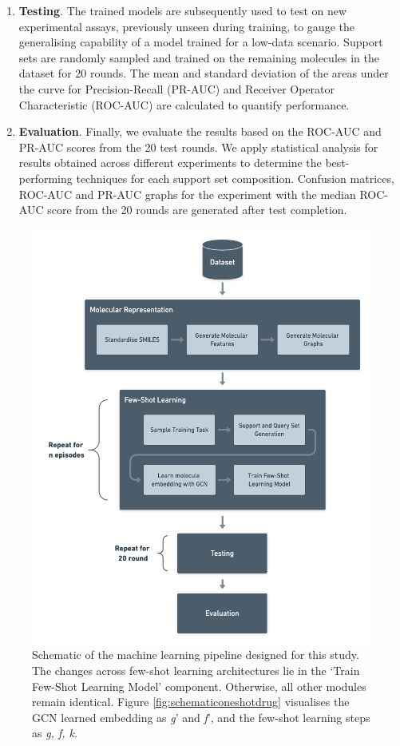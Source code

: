 \documentclass[journal=jcisd8,manuscript=article]{achemso} %
\begin{document}
\begin{enumerate}
    \item \textbf{Testing}. The trained models are subsequently used to test on new experimental assays, previously unseen during training, to gauge the generalising capability of a model trained for a low-data scenario. Support sets are randomly sampled and trained on the remaining molecules in the dataset for 20 rounds. The mean and standard deviation of the areas under the curve for Precision-Recall (PR-AUC) and Receiver Operator Characteristic (ROC-AUC) are calculated to quantify performance.

    \item \textbf{Evaluation}. Finally, we evaluate the results based on the ROC-AUC and PR-AUC scores from the 20 test rounds. We apply statistical analysis for results obtained across different experiments to determine the best-performing techniques for each support set composition. Confusion matrices, ROC-AUC and PR-AUC graphs for the experiment with the median ROC-AUC score from the 20 rounds are generated after test completion.
\end{enumerate}

\begin{figure}[!ht]
    \centering
    \includegraphics[width=0.9\linewidth]{img/architecture-schematic.png}
    \caption[Schematic of the major parts in our architecture]{Schematic of the machine learning pipeline designed for this study. The changes across few-shot learning architectures lie in the `Train Few-Shot Learning Model' component. Otherwise, all other modules remain identical. Figure \ref{fig:schematiconeshotdrug} visualises the GCN learned embedding as \textit{g}' and \textit{f}', and the few-shot learning steps as \textit{g, f, k}.}
    \label{fig:architecture-schematic}
\end{figure}
\end{document}
